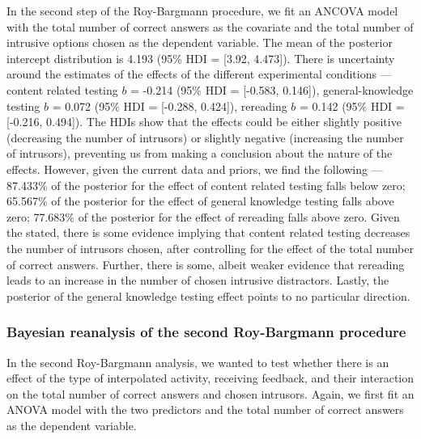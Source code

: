 \documentclass[../main.tex]{subfiles}
\begin{document}
In the second step of the Roy-Bargmann procedure, we fit an ANCOVA model
with the total number of correct answers as the covariate and the total
number of intrusive options chosen as the dependent variable. The mean
of the posterior intercept distribution is 4.193 (95\% HDI = {[}3.92,
4.473{]}). There is uncertainty around the estimates of the effects of
the different experimental conditions --- content related testing \(b\)
= -0.214 (95\% HDI = {[}-0.583, 0.146{]}), general-knowledge testing
\(b\) = 0.072 (95\% HDI = {[}-0.288, 0.424{]}), rereading \(b\) = 0.142
(95\% HDI = {[}-0.216, 0.494{]}). The HDIs show that the effects could
be either slightly positive (decreasing the number of intrusors) or
slightly negative (increasing the number of intrusors), preventing us
from making a conclusion about the nature of the effects. However, given
the current data and priors, we find the following --- 87.433\% of the
posterior for the effect of content related testing falls below zero;
65.567\% of the posterior for the effect of general knowledge testing
falls above zero; 77.683\% of the posterior for the effect of rereading
falls above zero. Given the stated, there is some evidence implying that
content related testing decreases the number of intrusors chosen, after
controlling for the effect of the total number of correct answers.
Further, there is some, albeit weaker evidence that rereading leads to
an increase in the number of chosen intrusive distractors. Lastly, the
posterior of the general knowledge testing effect points to no
particular direction.

\hypertarget{bayesian-reanalysis-of-the-second-roy-bargmann-procedure}{%
\subsubsection{Bayesian reanalysis of the second Roy-Bargmann
procedure}\label{bayesian-reanalysis-of-the-second-roy-bargmann-procedure}}

In the second Roy-Bargmann analysis, we wanted to test whether there is
an effect of the type of interpolated activity, receiving feedback, and
their interaction on the total number of correct answers and chosen
intrusors. Again, we first fit an ANOVA model with the two predictors
and the total number of correct answers as the dependent variable.
\end{document}
